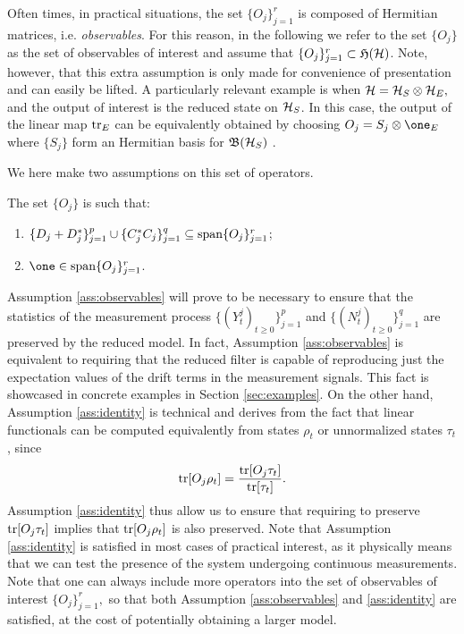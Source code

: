 \documentclass[aihp,12pt]{imsart}
\begin{document}
Often times, in practical situations, the set $\{O_j\}_{j=1}^r$ is composed of Hermitian matrices, i.e. {\em observables}. For this reason, in the following we refer to the set $\{O_j\}$ as the set of observables of interest and assume that $\{O_j\}_{j=1}^r\subset\mathfrak{H}(\mathcal{H})$. Note, however, that this extra assumption is only made for convenience of presentation and can easily be lifted. 
A particularly relevant example is when $\mathcal{H} = \mathcal{H}_S\otimes\mathcal{H}_E,$ and the output of interest is the reduced state on $\mathcal{H}_S$. In this case, the output of the linear map ${\rm tr}_E$ can be equivalently obtained by choosing $O_j = S_j\otimes \one_E$ where $\{S_j\}$ form an Hermitian basis for $\mathfrak{B}(\mathcal{H}_S)$ \cite{prxq2024}. 

We here make two assumptions on this set of operators. 
\begin{assumption*}
    The set $\{O_j\}$ is such that:
    \begin{enumerate}
        \item $\{D_j+D_j^*\}_{j=1}^p\cup\{C_j^* C_j\}_{j=1}^q\subseteq{\rm span}\{O_j\}_{j=1}^r$; \label{ass:observables}
        \item $\one\in\Span\{O_j\}_{j=1}^r$. \label{ass:identity}
    \end{enumerate}
\end{assumption*}
Assumption \ref{ass:observables} will prove to be necessary to ensure that the statistics of the measurement process $\{(Y_t^j)_{t\geq0}\}_{j=1}^p$ and $\{(N_t^j)_{t\geq0}\}_{j=1}^q$ are preserved by the reduced model. In fact, Assumption \ref{ass:observables} is equivalent to requiring that the reduced filter is capable of reproducing just the expectation values of the drift terms in the measurement signals. This fact is showcased in concrete examples in Section \ref{sec:examples}.
On the other hand, Assumption \ref{ass:identity} is technical and derives from the fact that linear functionals can be computed equivalently from states $\rho_t$ or unnormalized states $\tau_t$, since 
\[{\rm tr}[O_j\rho_t] = \frac{{\rm tr}[O_j\tau_t]}{{\rm tr}[\tau_t]}.\]
Assumption \ref{ass:identity} thus allow us to ensure that requiring to preserve \({\rm tr}[O_j\tau_t]\) implies that \({\rm tr}[O_j\rho_t]\) is also preserved. Note that Assumption \ref{ass:identity} is satisfied in most cases of practical interest, as it physically means that we can test the presence of the system undergoing continuous measurements. Note that one can always include more operators into the set of observables of interest $\{O_j\}_{j=1}^r,$ so that both Assumption \ref{ass:observables} and \ref{ass:identity} are satisfied, at the cost of potentially obtaining a larger model. 
\end{document}
